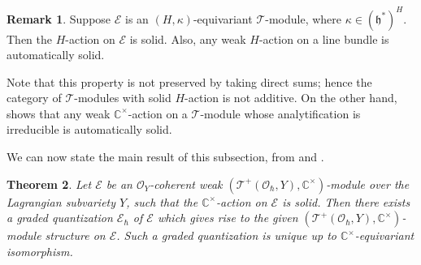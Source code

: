 \documentclass[11pt, a4paper]{amsart}
\newcommand{\C}{\mathbb{C}}
\newcommand{\fh}{\mathfrak{h}}
\newcommand{\cE}{\mathcal{E}}
\newcommand{\hb}{\hbar}
\newcommand{\TT}{\mathscr{T}}
\newcommand{\tatp}{\TT^+(\Q, Y)}
\newcommand{\cm}{\C^\times}
\newcommand{\OO}{\mathcal{O}}
\newcommand{\Q}{\OO_\hb}
\newtheorem{Thm}{Theorem}[subsection]
\theoremstyle{definition}
\newtheorem{defi}[Thm]{Definition}
\newtheorem{Rem}[Thm]{Remark}
\numberwithin{equation}{section}
\begin{document}
\begin{Rem} \label{rem:solid}
	Suppose $\cE$ is an $(H, \kappa)$-equivariant $\TT$-module, where $\kappa \in (\fh^*)^H$. Then the $H$-action on $\cE$ is solid. Also, any weak $H$-action on a line bundle is automatically solid.
	

	Note that this property is not preserved by taking direct sums; hence the category of $\TT$-modules with solid $H$-action is not additive. On the other hand, \cite[Proposition 6.10]{Yu:period} shows that any weak $\cm$-action on a $\TT$-module whose analytification is irreducible is automatically solid.
\end{Rem}

We can now state the main result of this subsection, from \cite[Theorem 4.3.3]{LY} and \cite[Theorem 6.7]{Yu:period}.

\begin{Thm} \label{thm:quan_lag}
	Let $\cE$ be an $\OO_Y$-coherent weak $(\tatp, \cm)$-module over the Lagrangian subvariety $Y$, such that the $\cm$-action on $\cE$ is solid. Then there exists a graded quantization $\cE_\hb$ of $\cE$ which gives rise to the given $(\tatp, \cm)$-module structure on $\cE$. Such a graded quantization is unique up to $\cm$-equivariant isomorphism.
\end{Thm}
\end{document}
